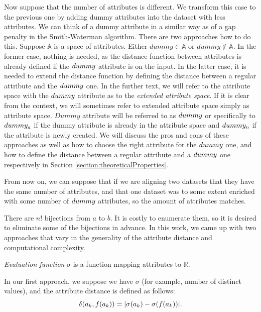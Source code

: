Now suppose that the number of attributes is different. We transform this case to the previous one by adding dummy attributes into the dataset with less attributes. We can think of a dummy attribute in a similar way as of a gap penalty in the Smith-Waterman algorithm. There are two approaches how to do this. Suppose $\mathbb{A}$ is a space of attributes. Either $dummy \in \mathbb{A}$ or $dummy \notin \mathbb{A}$. In the former case, nothing is needed, as the distance function between attributes is already defined if the $dummy$ attribute is on the input. In the latter case, it is needed to extend the distance function by defining the distance between a regular attribute and the $dummy$ one.
In the further text, we will refer to the attribute space with the $dummy$ attribute as to the \emph{extended attribute space}. If it is clear from the context, we will sometimes refer to extended attribute space simply as attribute space. $Dummy$ attribute will be referred to as $dummy$ or specifically to $dummy_a$ if the dummy attribute is already in the attribute space and $dummy_n$ if the attribute is newly created.
We will discuss the pros and cons of these approaches as well as how to choose the right attribute for the $dummy$ one, and how to define the distance between a regular attribute and a $dummy$ one respectively in Section \ref{section:theoreticalProperties}.

From now on, we can suppose that if we are aligning two datasets that they have the same number of attributes, and that one dataset was to some extent enriched with some number of $dummy$ attributes, so the amount of attributes matches.

There are $n!$ bijections from $a$ to $b$. It is costly to enumerate them, so it is desired to eliminate some of the bijections in advance. In this work, we came up with two approaches that vary in the generality of the attribute distance and computational complexity.
\begin{definition}
\emph{Evaluation function} $\sigma$ is a function mapping attributes to $\mathbb{R}$.
\end{definition}

In our first approach, we suppose we have $\sigma$ (for example, number of distinct values), and the attribute distance is defined as follows:
\begin{equation}
\delta(a_k, f(a_k))=|\sigma(a_k)-\sigma(f(a_k))|.
\label{eq:sigma}
\end{equation}

